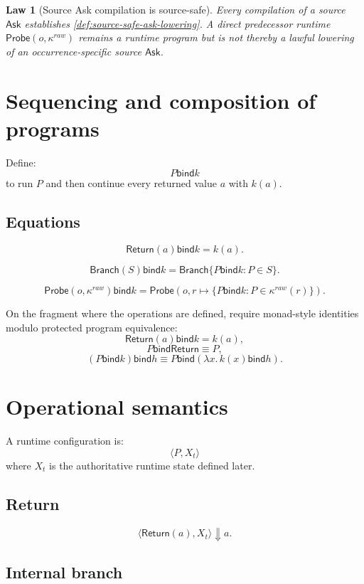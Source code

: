 \documentclass[11pt,oneside]{article}
\newtheorem{law}[definition]{Law}
\newcommand{\bind}{\mathbin{\mathsf{bind}}}
\begin{document}
\begin{law}[Source Ask compilation is source-safe]\label{law:source-ask-safe}
Every compilation of a source \(\mathsf{Ask}\) establishes
\cref{def:source-safe-ask-lowering}.  A direct predecessor runtime
\(\mathsf{Probe}(o,\kappa^{raw})\) remains a runtime program but is not thereby a lawful lowering of
an occurrence-specific source \(\mathsf{Ask}\).
\end{law}

\section{Sequencing and composition of programs}

Define:
\[
P\bind k
\]
to run \(P\) and then continue every returned value \(a\) with \(k(a)\).

\subsection{Equations}

\[
\boxed{
\mathsf{Return}(a)\bind k
=
k(a).
}
\]

\[
\boxed{
\mathsf{Branch}(S)\bind k
=
\mathsf{Branch}\{P\bind k:P\in S\}.
}
\]

\[
\boxed{
\mathsf{Probe}(o,\kappa^{raw})\bind k
=
\mathsf{Probe}
\left(
o,
r\mapsto
\{P\bind k:P\in\kappa^{raw}(r)\}
\right).
}
\]

On the fragment where the operations are defined, require monad-style identities modulo protected program equivalence:
\[
\mathsf{Return}(a)\bind k=k(a),
\]
\[
P\bind\mathsf{Return}\equiv P,
\]
\[
(P\bind k)\bind h
\equiv
P\bind(\lambda x.\,k(x)\bind h).
\]

\section{Operational semantics}

A runtime configuration is:
\[
\boxed{
\langle P,X_t\rangle
}
\]
where \(X_t\) is the authoritative runtime state defined later.

\subsection{Return}

\[
\langle\mathsf{Return}(a),X_t\rangle
\Downarrow a.
\]

\subsection{Internal branch}
\end{document}
